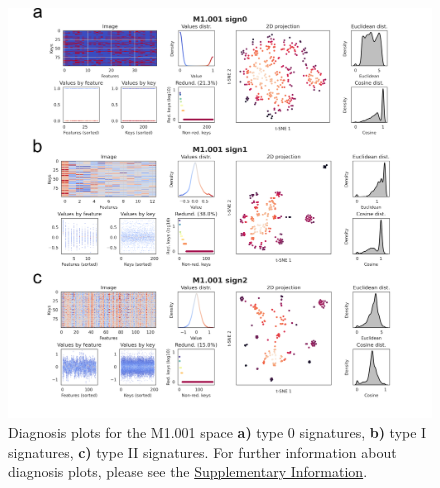 \begin{figure}[htbp]
  \centering
  \includegraphics[width=1\linewidth]{figures/Protocols/Supplementary/M1.001_v2.png}
  \caption{
    Diagnosis plots for the M1.001 space
    \textbf{a)} type 0 signatures,
    \textbf{b)} type I signatures,
    \textbf{c)} type II signatures. For further information about diagnosis plots, please see the \hyperref[Supplementary_Protocols_Diagnosis]{Supplementary Information}.
  }
  \label{Protocols_FigS10}
\end{figure}

